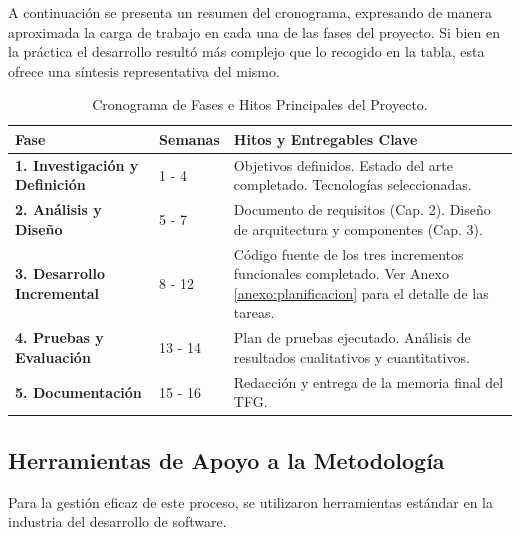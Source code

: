 \newpage
A continuación se presenta un resumen del cronograma, expresando de manera aproximada la carga de trabajo en cada una de las fases del proyecto. Si bien en la práctica el desarrollo resultó más complejo que lo recogido en la tabla, esta ofrece una síntesis representativa del mismo.
\begin{table}[H]
    \centering
    \renewcommand{\arraystretch}{1.3}
    \caption{Cronograma de Fases e Hitos Principales del Proyecto.}
    \label{tab:cronograma}
    \begin{tabularx}{\textwidth}{|l|l|X|}
    \hline
    \textbf{Fase} & \textbf{Semanas} & \textbf{Hitos y Entregables Clave} \\
    \hline
    \textbf{1. Investigación y Definición} & 1 - 4 & Objetivos definidos. Estado del arte completado. Tecnologías seleccionadas. \\
    \hline
    \textbf{2. Análisis y Diseño} & 5 - 7 & Documento de requisitos (Cap. 2). Diseño de arquitectura y componentes (Cap. 3). \\
    \hline
    \textbf{3. Desarrollo Incremental} & 8 - 12 & Código fuente de los tres incrementos funcionales completado. Ver Anexo \ref{anexo:planificacion} para el detalle de las tareas. \\
    \hline
    \textbf{4. Pruebas y Evaluación} & 13 - 14 & Plan de pruebas ejecutado. Análisis de resultados cualitativos y cuantitativos. \\
    \hline
    \textbf{5. Documentación} & 15 - 16 & Redacción y entrega de la memoria final del TFG. \\
    \hline
    \end{tabularx}
\end{table}

\newpage
\subsection{Herramientas de Apoyo a la Metodología}
Para la gestión eficaz de este proceso, se utilizaron herramientas estándar en la industria del desarrollo de software.

